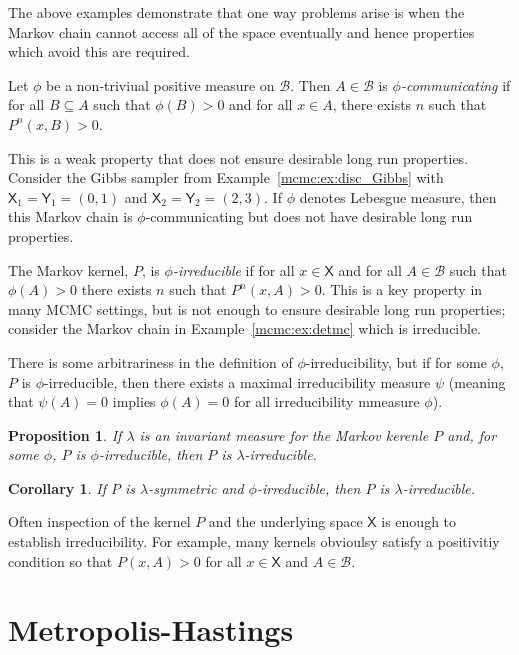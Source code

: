\documentclass[12pt]{article}
\theoremstyle{plain}
\newtheorem{prop}[thm]{Proposition}
\newtheorem{cor}{Corollary}[section]
\theoremstyle{definition}
\theoremstyle{remark}
\newcommand{\X}{\mathsf{X}}
\newcommand{\Y}{\mathsf{Y}}
\newcommand{\B}{\mathcal{B}}
\begin{document}
The above examples demonstrate that one way problems arise is when the
Markov chain cannot access all of the space eventually and hence
properties which avoid this are required.

Let $\phi$ be a non-triviual positive measure on $\B$.  Then $A \in
\B$ is {\em $\phi$-communicating} if for all $B \subseteq A$ such that
$\phi(B) > 0$ and for all $x \in A$, there exists $n$ such that
$P^n(x,B) >0$.

This is a weak property that does not ensure desirable long run
properties.  Consider the Gibbs sampler from
Example~\ref{mcmc:ex:disc_Gibbs} with $\X_1 = \Y_1 = (0,1)$ and
$\X_2 = \Y_2 = (2,3)$. If $\phi$ denotes Lebesgue measure, then this
Markov chain is $\phi$-communicating but does not have desirable long
run properties.

The Markov kernel, $P$,  is {\em $\phi$-irreducible} if for all $x \in \X$ and
for all $A \in \B$ such that $\phi(A) > 0$ there exists $n$ such that
$P^n (x, A) > 0$.  This is a key property in many MCMC settings, but
is not enough to ensure desirable long run properties; consider the
Markov chain in Example~\ref{mcmc:ex:detmc} which is irreducible.

There is some arbitrariness in the definition of
$\phi$-irreducibility, but if for some $\phi$, $P$ is
$\phi$-irreducible, then there exists a maximal irreducibility
measure $\psi$ (meaning that $\psi(A) = 0$ implies $\phi(A)=0$ for all
irreducibility mmeasure $\phi$).

\begin{prop}
  \label{mcmc:prop:inv_irreducible}
  If $\lambda$ is an invariant measure for the Markov kerenle $P$ and,
  for some $\phi$, $P$ is $\phi$-irreducible, then $P$ is
  $\lambda$-irreducible. 
\end{prop}

\begin{cor}
  If $P$ is $\lambda$-symmetric and $\phi$-irreducible, then $P$ is
  $\lambda$-irreducible.  
 \end{cor}

Often inspection of the kernel $P$ and the underlying space $\X$
is enough to establish irreducibility.  For example, many kernels
obvioulsy satisfy a positivitiy condition so that $P(x, A) > 0$ for
all $x \in \X$ and $A \in \B$.
 
 


\section{Metropolis-Hastings}
\label{mcmc:sec:mh}
\end{document}
